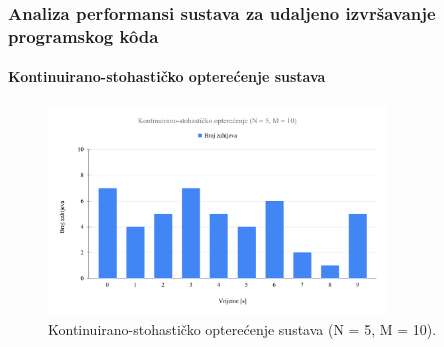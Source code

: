 \documentclass{beamer}
\newif\ifplacelogo
\begin{document}


\placelogofalse
\begin{frame}
\frametitle{Analiza performansi sustava za udaljeno izvršavanje programskog kôda}
\framesubtitle{Kontinuirano-stohastičko opterećenje sustava}
\begin{figure}[htb]
	\centering
	\includegraphics[width=0.8\textwidth]{images/Kontinuirano-stohasticko opterecenje (N = 5, M = 10).pdf}
	\caption{
		Kontinuirano-stohastičko opterećenje sustava (N = 5, M = 10).
	}
\end{figure}
\end{frame}
\placelogotrue
\end{document}
